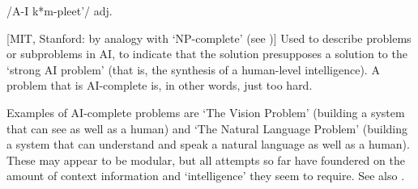  /A-I k*m-pleet'/ adj.

[MIT, Stanford: by analogy with `NP-complete' (see )] Used to describe problems or subproblems in AI, to indicate that the
solution presupposes a solution to the `strong AI problem' (that is, the synthesis of a human-level intelligence). A problem that is
AI-complete is, in other words, just too hard.

Examples of AI-complete problems are `The Vision Problem' (building a system that can see as well as a human) and `The Natural Language
Problem' (building a system that can understand and speak a natural language as well as a human). These may appear to be modular, but all
attempts so far have foundered on the amount of context information and `intelligence' they seem to require. See also .

